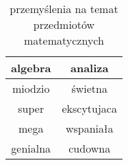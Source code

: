 \begin{table}[]
\centering
\begin{tabular}{|c|c|}
\hline
\textbf{algebra} & \textbf{analiza} \\ \hline
miodzio          & świetna          \\ \hline
super            & ekscytujaca      \\ \hline
mega             & wspaniała        \\ \hline
genialna         & cudowna          \\ \hline
\end{tabular}
\label{tab:matematyczne}
\caption{przemyślenia na temat przedmiotów matematycznych}
\end{table}